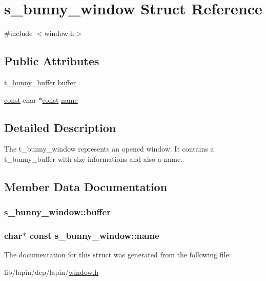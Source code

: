 \hypertarget{structs__bunny__window}{\section{s\-\_\-bunny\-\_\-window Struct Reference}
\label{structs__bunny__window}
}


{\ttfamily \#include $<$window.\-h$>$}

\subsection*{Public Attributes}
\begin{DoxyCompactItemize}
\item 
\hyperlink{buffer_8h_aaadbd154c7e3790c2d8ed734f79b64bd}{t\-\_\-bunny\-\_\-buffer} \hyperlink{structs__bunny__window_af0434996c0cc9d59a92fbebbcd6cd854}{buffer}
\item 
\hyperlink{term__entry_8h_a57bd63ce7f9a353488880e3de6692d5a}{const} char $\ast$\hyperlink{term__entry_8h_a57bd63ce7f9a353488880e3de6692d5a}{const} \hyperlink{structs__bunny__window_a4b3fbc2d0a310e7bff33cc4200f4a7b3}{name}
\end{DoxyCompactItemize}


\subsection{Detailed Description}
The t\-\_\-bunny\-\_\-window represents an opened window. It contains a t\-\_\-bunny\-\_\-buffer with size informations and also a name. 

\subsection{Member Data Documentation}
\hypertarget{structs__bunny__window_af0434996c0cc9d59a92fbebbcd6cd854}{
\subsubsection[{buffer}]{ s\-\_\-bunny\-\_\-window\-::buffer}}\label{structs__bunny__window_af0434996c0cc9d59a92fbebbcd6cd854}
\hypertarget{structs__bunny__window_a4b3fbc2d0a310e7bff33cc4200f4a7b3}{
\subsubsection[{name}]{ char$\ast$ {\bf const} s\-\_\-bunny\-\_\-window\-::name}}\label{structs__bunny__window_a4b3fbc2d0a310e7bff33cc4200f4a7b3}


The documentation for this struct was generated from the following file\-:\begin{DoxyCompactItemize}
\item 
lib/lapin/dep/lapin/\hyperlink{window_8h}{window.\-h}\end{DoxyCompactItemize}
